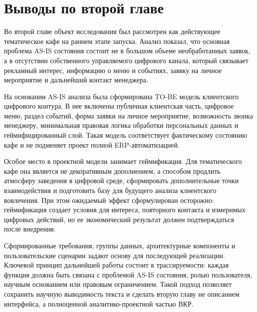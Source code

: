 \section{Выводы по второй главе}

Во второй главе объект исследования был рассмотрен как действующее тематическое кафе на раннем этапе запуска. Анализ показал, что основная проблема AS-IS состояния состоит не в большом объеме необработанных заявок, а в отсутствии собственного управляемого цифрового канала, который связывает рекламный интерес, информацию о меню и событиях, заявку на личное мероприятие и дальнейший контакт менеджера.

На основании AS-IS анализа была сформирована TO-BE модель клиентского цифрового контура. В нее включены публичная клиентская часть, цифровое меню, раздел событий, форма заявки на личное мероприятие, возможность звонка менеджеру, минимальная правовая логика обработки персональных данных и геймифицированный слой. Такая модель соответствует фактическому состоянию кафе и не подменяет проект полной ERP-автоматизацией.

Особое место в проектной модели занимает геймификация. Для тематического кафе она является не декоративным дополнением, а способом продлить атмосферу заведения в цифровой среде, сформировать дополнительные точки взаимодействия и подготовить базу для будущего анализа клиентского вовлечения. При этом ожидаемый эффект сформулирован осторожно: геймификация создает условия для интереса, повторного контакта и измеримых цифровых действий, но ее экономический результат должен подтверждаться после внедрения.

Сформированные требования, группы данных, архитектурные компоненты и пользовательские сценарии задают основу для последующей реализации. Ключевой принцип дальнейшей работы состоит в трассируемости: каждая функция должна быть связана с проблемой AS-IS состояния, ролью пользователя, научным основанием или правовым ограничением. Такой подход позволяет сохранить научную выводимость текста и сделать вторую главу не описанием интерфейса, а полноценной аналитико-проектной частью ВКР.
